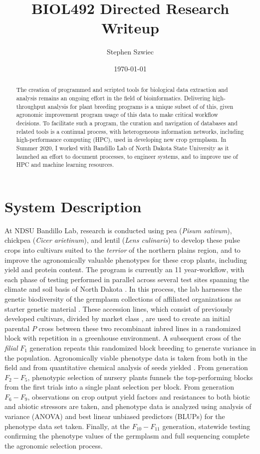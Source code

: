 \documentclass[12pt, letterpaper,oneocolumn]{article}
\title{BIOL492 Directed Research Writeup}
\author{Stephen Szwiec}
\date{\today}
\begin{document}
	\maketitle

	\thispagestyle{fancy}
	\tableofcontents
	\newpage
	\begin{abstract}
	The creation of programmed and scripted tools for biological data extraction and analysis remains an ongoing effort in the field of bioinformatics. Delivering high-throughput analysis for plant breeding programs is a unique subset of of this, given agronomic improvement program usage of this data to make critical workflow decisions. To facilitate such a program, the curation and navigation of databases and related tools is a continual process, with heterogeneous information networks, including high-performance computing (HPC), used in developing new crop germplasm. In Summer 2020, I worked with Bandillo Lab of North Dakota State University as it launched an effort to document processes, to engineer systems, and to improve use of HPC and machine learning resources.
	\end{abstract}

	\section{System Description}
	At NDSU Bandillo Lab, research is conducted using pea (\textit{Pisum sativum}), chickpea (\textit{Cicer arietinum}), and lentil (\textit{Lens culinaris}) to develop these pulse crops into cultivars suited to the \textit{terrior} of the northern plains region, and to improve the agronomically valuable phenotypes for these crop plants, including yield and protein content. The program is currently an 11 year-workflow, with each phase of testing performed in parallel across several test sites spanning the climate and soil basis of North Dakota \cite{NDdawn}. In this process, the lab harnesses the genetic biodiversity of the germplasm collections of affiliated organizations as starter genetic material \cite{coyne}. These accession lines, which consist of previously developed cultivars, divided by market class \cite{peaagro} \cite{lentilagro}, are used to create an initial parental $P$ cross between these two recombinant inbred lines in a randomized block with repetition in a greenhouse environment. A subsequent cross of the \textit{filial} $F_1$ generation repeats this randomized block breeding to generate variance in the population. Agronomically viable phenotype data is taken from both in the field and from quantitative chemical analysis of seeds yielded \cite{tpg2}. From generation $F_2-F_5$, phenotypic selection of nursery plants funnels the top-performing blocks from the first trials into a single plant selection per block. From generation $F_6-F_9$, observations on crop output yield factors and resistances to both biotic and abiotic stressors are taken, and phenotype data is analyzed using analysis of variance (ANOVA) \cite{dagenlie} and best linear unbiased predictors (BLUPs) \cite{blup} for the phenotype data set taken. Finally, at the $F_{10}-F_{11}$ generation, statewide testing confirming the phenotype values of the germplasm and full sequencing complete the agronomic selection process.
\end{document}
